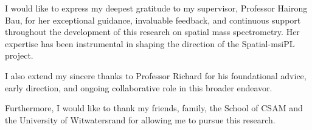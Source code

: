 \documentclass[
12pt, %
oneside, %
english, %
onehalfspacing, %
nolistspacing, %
headsepline, %
]{MastersDoctoralThesis} %
\begin{document}


\begin{acknowledgements}
\addchaptertocentry{\acknowledgementname} %

I would like to express my deepest gratitude to my supervisor, Professor Hairong Bau, for her exceptional guidance, invaluable feedback, and continuous support throughout the development of this research on spatial mass spectrometry. Her expertise has been instrumental in shaping the direction of the Spatial-msiPL project. 

I also extend my sincere thanks to Professor Richard for his foundational advice, early direction, and ongoing collaborative role in this broader endeavor. 

Furthermore, I would like to thank my friends, family, the School of CSAM and the University of Witwatersrand for allowing me to pursue this research.

\end{acknowledgements}


\tableofcontents %


\listoffigures %

\listoftables %


\mainmatter %
\pagestyle{thesis} %
\end{document}

